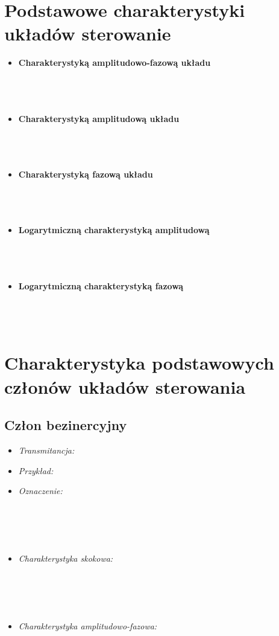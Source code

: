 \documentclass[a4paper]{article}
\begin{document}
\section{Podstawowe charakterystyki układów sterowanie}
\begin{itemize}
\item \textbf{Charakterystyką amplitudowo-fazową układu} \\\\\\\\\pagebreak
\item \textbf{Charakterystyką amplitudową układu} \\\\\\\\
\item \textbf{Charakterystyką fazową układu} \\\\\\\\
\item \textbf{Logarytmiczną charakterystyką amplitudową} \\\\\\\\
\item \textbf{Logarytmiczną charakterystyką fazową} \\\\\\\\
\end{itemize}

\section{Charakterystyka podstawowych członów układów sterowania}
\subsection{Człon bezinercyjny}
\begin{itemize}
\item \emph{Transmitancja: }
\item \emph{Przykład: }
\item \emph {Oznaczenie: } \\\\\\\\\\
\item \emph{Charakterystyka skokowa: } \\\\\\\\\\
\item \emph{Charakterystyka amplitudowo-fazowa: } \\\\\\\\\\
\end{itemize}
\end{document}
